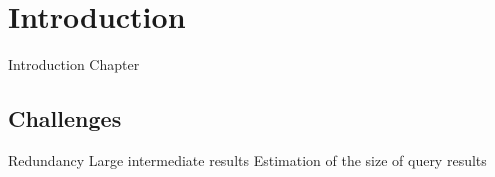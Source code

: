 \chapter{Introduction}

Introduction Chapter

\section{Challenges}

Redundancy
Large intermediate results
Estimation of the size of query results
